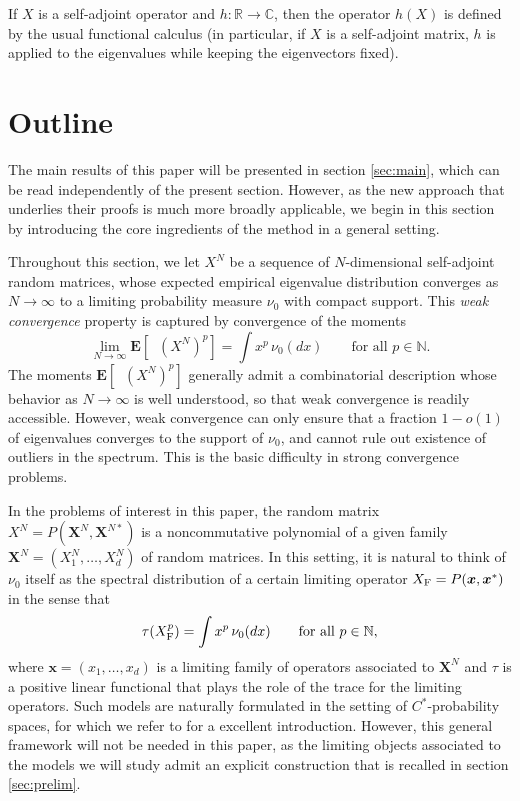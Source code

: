 \documentclass[10pt,reqno]{amsart}
\theoremstyle{definition}
\theoremstyle{remark}
\numberwithin{equation}{section}
\numberwithin{figure}{section}
\numberwithin{table}{section}
\newcommand{\ntrN}{\mathop{\mathrm{tr}_N}}
\newcommand{\EE}{\mathbf{E}}
\begin{document}
If $X$ is a self-adjoint operator and $h:\mathbb{R}\to\mathbb{C}$, then 
the operator $h(X)$ is defined by the usual functional calculus (in 
particular, if $X$ is a self-adjoint matrix, $h$ is applied to the 
eigenvalues while keeping the eigenvectors fixed).


\section{Outline}
\label{sec:outline}

The main results of this paper will be presented in section 
\ref{sec:main}, which can be read independently of the present section. 
However, as the new approach that underlies their proofs is much more 
broadly applicable, we begin in this section by introducing the core 
ingredients of the method in a general setting.

Throughout this section, we let $X^N$ be a sequence of $N$-dimensional 
self-adjoint random matrices, whose 
expected empirical eigenvalue distribution
converges as $N\to\infty$ to a limiting probability measure $\nu_0$ with 
compact support. This \emph{weak convergence} property is captured by 
convergence of the moments
$$
	\lim_{N\to\infty} \EE[\ntrN (X^N)^p] =
	\int x^p\, \nu_0(dx)\qquad\text{for all }p\in\mathbb{N}.
$$
The moments $\EE[\ntrN (X^N)^p]$ generally admit a combinatorial
description whose behavior as $N\to\infty$ is well understood,  
so that weak convergence is readily accessible. However, weak convergence 
can only ensure that a fraction $1-o(1)$ of eigenvalues converges to the 
support of $\nu_0$, and cannot rule out existence of outliers in the 
spectrum. This is the basic difficulty in strong convergence problems.

In the problems of interest in this paper, the random matrix 
$X^N=P(\boldsymbol{X}^N,\boldsymbol{X}^{N*})$ is a noncommutative 
polynomial of a given family $\boldsymbol{X}^N=(X_1^N,\ldots,X_d^N)$ of 
random matrices. In this setting, it is natural to think of
$\nu_0$ itself as the spectral distribution of a certain limiting operator
$X_{\rm F}=P(\boldsymbol{x},\boldsymbol{x}^*)$ in the sense that
$$
	\tau(X_{\rm F}^p) = \int x^p\, \nu_0(dx)\qquad\text{for all }
	p\in\mathbb{N},
$$
where $\boldsymbol{x}=(x_1,\ldots,x_d)$ is a limiting family of operators
associated to $\boldsymbol{X}^N$ and $\tau$ is a positive linear 
functional that plays the role of the trace for the limiting 
operators. Such models are naturally 
formulated in the setting of $C^*$-probability spaces, for which we refer 
to \cite{NS06} for a excellent introduction. However, this general framework 
will not be needed in this paper, as the limiting objects associated to 
the models we will study admit an explicit construction that is 
recalled in section \ref{sec:prelim}. 
\end{document}
